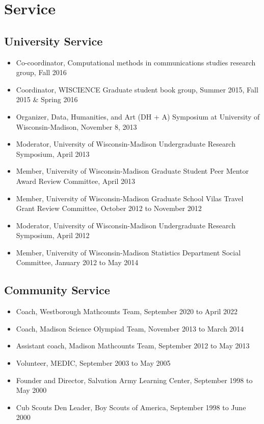 \section*{Service}
\subsection*{University Service}
\begin{itemize}
\item Co-coordinator, Computational methods in communications studies research group, Fall 2016
\item Coordinator, WISCIENCE Graduate student book group, Summer 2015, Fall 2015 \& Spring 2016
\item Organizer, Data, Humanities, and Art (DH + A) Symposium at University of Wisconsin-Madison, November 8, 2013
\item Moderator, University of Wisconsin-Madison Undergraduate Research Symposium, April 2013
\item Member, University of Wisconsin-Madison Graduate Student Peer Mentor Award Review Committee,
April 2013
\item Member, University of Wisconsin-Madison Graduate School Vilas Travel Grant Review Committee,
October 2012 to November 2012
\item Moderator, University of Wisconsin-Madison Undergraduate Research Symposium, April 2012
\item Member, University of Wisconsin-Madison Statistics Department Social Committee, January 2012 to
May 2014
\end{itemize}

\subsection*{Community Service}
\begin{itemize}
\item Coach, Westborough Mathcounts Team, September 2020 to April 2022
\item Coach, Madison Science Olympiad Team, November 2013 to March 2014
\item Assistant coach, Madison Mathcounts Team, September 2012 to May 2013
\item Volunteer, MEDIC, September 2003 to May 2005
\item Founder and Director, Salvation Army Learning Center, September 1998 to May 2000
\item Cub Scouts Den Leader, Boy Scouts of America, September 1998 to June 2000
\end{itemize}

